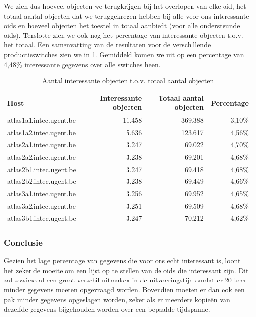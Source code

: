 We zien dus hoeveel objecten we terugkrijgen bij het overlopen van elke \gls{oid},
het totaal aantal objecten dat we teruggekregen hebben bij alle voor ons interessante \glspl{oid} en
hoeveel objecten het toestel in totaal aanbiedt (voor alle ondersteunde \glspl{oid}).
Tenslotte zien we ook nog het percentage van interessante objecten t.o.v. het totaal.
Een samenvatting van de resultaten voor de verschillende productieswitches zien we in \cref{tabel-fracties}.
Gemiddeld komen we uit op een percentage van 4,48\% interessante gegevens over alle switches heen.

\begin{table}[h]
\centering
\begin{tabular}{@{}lrrr@{}}
\toprule
Host                    & Interessante objecten & Totaal aantal objecten & Percentage \\ \midrule
atlas1a1.intec.ugent.be & 11.458                & 369.388                & 3,10\%     \\
atlas1a2.intec.ugent.be & 5.636                 & 123.617                & 4,56\%     \\
atlas2a1.intec.ugent.be & 3.247                 & 69.022                 & 4,70\%     \\
atlas2a2.intec.ugent.be & 3.238                 & 69.201                 & 4,68\%     \\
atlas2b1.intec.ugent.be & 3.247                 & 69.418                 & 4,68\%     \\
atlas2b2.intec.ugent.be & 3.238                 & 69.449                 & 4,66\%     \\
atlas3a1.intec.ugent.be & 3.256                 & 69.952                 & 4,65\%     \\
atlas3a2.intec.ugent.be & 3.251                 & 69.509                 & 4,68\%     \\
atlas3b1.intec.ugent.be & 3.247                 & 70.212                 & 4,62\%     \\ \bottomrule
\end{tabular}
\caption{Aantal interessante objecten t.o.v. totaal aantal objecten}
\label{tabel-fracties}
\end{table}

\subsubsection{Conclusie}

Gezien het lage percentage van gegevens die voor ons echt interessant is,
loont het zeker de moeite om een lijst op te stellen van de \glspl{oid} die interessant zijn.
Dit zal sowieso al een groot verschil uitmaken in de uitvoeringstijd omdat er 20 keer minder gegevens moeten opgevraagd worden.
Bovendien moeten er dan ook een pak minder gegevens opgeslagen worden,
zeker als er meerdere kopieën van dezelfde gegevens bijgehouden worden over een bepaalde tijdspanne.


